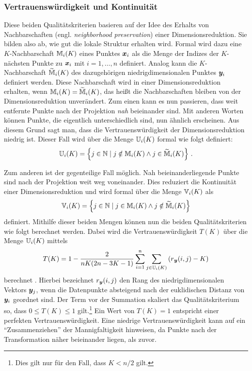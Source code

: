 
\subsubsection{Vertrauenswürdigkeit und Kontinuität}
\label{ch:Vergleich:sec:Methodik:subsec:Qualitaetskriterien:TC}
Diese beiden Qualitätskriterien basieren auf der Idee des Erhalts von Nachbarschaften (engl.
\textit{neighborhood preservation}) einer Dimensionsreduktion. Sie bilden also ab, wie gut die
lokale Struktur erhalten wird. Formal wird dazu eine $K$-Nachbarschaft $\mathbb{M}_i(K)$ eines Punktes $\bm{x}_i$ als die Menge der Indizes der $K$-nächsten Punkte zu $\bm{x}_i$ mit $i = 1, \ldots, n$ definiert.
Analog kann die $K$-Nachbarschaft $\widetilde{\mathbb{M}}_i(K)$ des dazugehörigen niedrigdimensionalen
Punktes $\bm{y}_i$ definiert werden. Diese Nachbarschaft wird in einer Dimensionsreduktion
erhalten, wenn $\mathbb{M}_i(K) = \widetilde{\mathbb{M}}_i(K)$, das heißt die Nachbarschaften bleiben von
der Dimensionsreduktion unverändert. Zum einen kann es nun passieren, dass weit entfernte Punkte nach der Projektion \textit{nah}
beieinander sind. Mit anderen Worten können Punkte, die eigentlich unterschiedlich sind, nun
ähnlich erscheinen. Aus diesem Grund sagt man, dass die Vertrauenswürdigkeit der
Dimensionsreduktion niedrig ist. Dieser Fall wird über die Menge $\mathbb{U}_i(K)$ formal wie folgt definiert:
\begin{equation}
	\mathbb{U}_i(K) =  \left\{ j \in \mathbb{N} \mid j \notin \mathbb{M}_i(K) \land j \in \widetilde{\mathbb{M}}_i(K) \right\} \, .
\end{equation}

Zum anderen ist der gegenteilige Fall möglich. Nah beieinanderliegende Punkte sind nach der
Projektion weit weg voneinander. Dies reduziert die Kontinuität einer Dimensionsreduktion \parencite[486 -- 487]{Venna.2001} und wird formal über die Menge $\mathbb{V}_i(K)$ als
\begin{equation}
	\mathbb{V}_i(K) =  \left\{ j \in \mathbb{N} \mid j \in \mathbb{M}_i(K) \land j \notin \widetilde{\mathbb{M}}_i(K) \right\}
\end{equation}
definiert. Mithilfe dieser beiden Mengen können nun die beiden Qualitätskriterien wie folgt berechnet werden. Dabei wird die Vertrauenswürdigkeit $T(K)$ über die Menge $\mathbb{U}_i(K)$ mittels
\begin{equation}
	T(K) = 1 - \frac{2}{nK(2n - 3K - 1)} \sum_{i = 1}^{n}\sum_{j \in \set{U}_i(K) } \left( r­_{\vect{y}}(i, j) - K \right)
\end{equation}
berechnet \parencite[487]{Venna.2001}. Hierbei bezeichnet $r_{\bm{y}}(i, j)$ den Rang des niedrigdimensionalen
Vektors $\bm{y}_j$, wenn die Datenpunkte absteigend nach der euklidischen Distanz von
$\bm{y}_i$ geordnet sind. Der Term vor der Summation skaliert das Qualitätskriterium so, dass $0
	\leq T(K) \leq 1$ gilt.\footnote{Dies gilt nur für den Fall, dass $K < n/2$ gilt.} Ein Wert von
$T(K) = 1­$ entspricht einer perfekten Vertrauenswürdigkeit. Eine niedrige Vertrauenswürdigkeit
kann auf ein \enquote{Zusammenziehen} der Mannigfaltigkeit hinweisen, da Punkte nach der
Transformation näher beieinander liegen, als zuvor.

